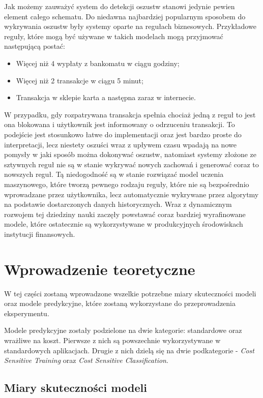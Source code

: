 \documentclass{book}
\begin{document}
	Jak możemy zauważyć system do detekcji oszustw stanowi jedynie pewien element całego schematu. Do niedawna najbardziej popularnym sposobem do wykrywania oszustw były systemy oparte na regułach biznesowych. Przykładowe reguły, które mogą być używane w takich modelach mogą przyjmować następującą postać:
	\begin{itemize}
		\item Więcej niż 4 wypłaty z bankomatu w ciągu godziny;
		\item Więcej niż 2 transakcje w ciągu 5 minut;
		\item Transakcja w sklepie karta a następna zaraz w internecie.
	\end{itemize}
	W przypadku, gdy rozpatrywana transakcja spełnia chociaż jedną z reguł to jest ona blokowana i użytkownik jest informowany o odrzuceniu transakcji. To podejście jest stosunkowo łatwe do implementacji oraz jest bardzo proste do interpretacji, lecz niestety oszuści wraz z upływem czasu wpadają na nowe pomysły w jaki sposób można dokonywać oszustw, natomiast systemy złożone ze sztywnych reguł nie są w stanie wykrywać nowych zachowań i generować coraz to nowszych reguł. Tą niedogodność są w stanie rozwiązać model uczenia maszynowego, które tworzą pewnego rodzaju reguły, które nie są bezpośrednio wprowadzane przez użytkownika, lecz automatycznie wykrywane przez algorytmy na podstawie dostarczonych danych historycznych. Wraz z dynamicznym rozwojem tej dziedziny nauki zaczęły powstawać coraz bardziej wyrafinowane modele, które ostatecznie są wykorzystywane w produkcyjnych środowiskach instytucji finansowych. 
	

\chapter{Wprowadzenie teoretyczne}

W tej części zostaną wprowadzone wszelkie potrzebne miary skuteczności modeli oraz modele predykcyjne, które zostaną wykorzystane do przeprowadzenia eksperymentu. 

Modele predykcyjne zostały podzielone na dwie kategorie: standardowe oraz wrażliwe na koszt. Pierwsze z nich są powszechnie wykorzystywane w standardowych aplikacjach. Drugie z nich dzielą się na dwie podkategorie - \textit{Cost Sensitive Training} oraz \textit{Cost Sensitive Classification}.

\section{Miary skuteczności modeli}
\end{document}
